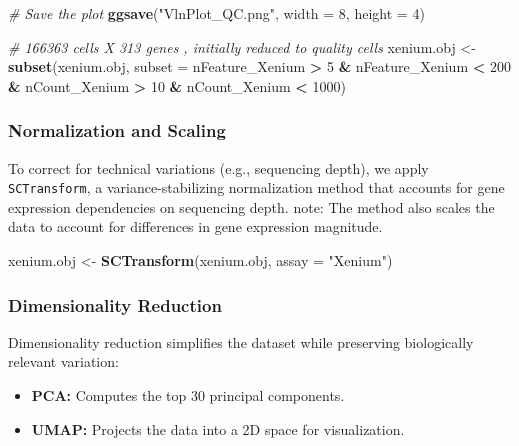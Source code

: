 \documentclass[
]{article}
\newenvironment{Shaded}{\begin{snugshade}}{\end{snugshade}}
\newcommand{\AttributeTok}[1]{\textcolor[rgb]{0.13,0.29,0.53}{#1}}
\newcommand{\CommentTok}[1]{\textcolor[rgb]{0.56,0.35,0.01}{\textit{#1}}}
\newcommand{\DecValTok}[1]{\textcolor[rgb]{0.00,0.00,0.81}{#1}}
\newcommand{\FunctionTok}[1]{\textcolor[rgb]{0.13,0.29,0.53}{\textbf{#1}}}
\newcommand{\NormalTok}[1]{#1}
\newcommand{\OtherTok}[1]{\textcolor[rgb]{0.56,0.35,0.01}{#1}}
\newcommand{\SpecialCharTok}[1]{\textcolor[rgb]{0.81,0.36,0.00}{\textbf{#1}}}
\newcommand{\StringTok}[1]{\textcolor[rgb]{0.31,0.60,0.02}{#1}}
\providecommand{\tightlist}{%
  \setlength{\itemsep}{0pt}\setlength{\parskip}{0pt}}
\begin{document}
\begin{Shaded}
\begin{Highlighting}[]
\CommentTok{\# Save the plot}
\FunctionTok{ggsave}\NormalTok{(}\StringTok{"VlnPlot\_QC.png"}\NormalTok{, }\AttributeTok{width =} \DecValTok{8}\NormalTok{, }\AttributeTok{height =} \DecValTok{4}\NormalTok{)}

\CommentTok{\# 166363 cells X 313 genes , initially reduced to quality cells}
\NormalTok{xenium.obj }\OtherTok{\textless{}{-}} \FunctionTok{subset}\NormalTok{(xenium.obj, }
                     \AttributeTok{subset =}\NormalTok{ nFeature\_Xenium }\SpecialCharTok{\textgreater{}} \DecValTok{5} \SpecialCharTok{\&}\NormalTok{ nFeature\_Xenium }\SpecialCharTok{\textless{}} \DecValTok{200} \SpecialCharTok{\&} 
\NormalTok{                       nCount\_Xenium }\SpecialCharTok{\textgreater{}} \DecValTok{10} \SpecialCharTok{\&}\NormalTok{ nCount\_Xenium }\SpecialCharTok{\textless{}} \DecValTok{1000}\NormalTok{)}
\end{Highlighting}
\end{Shaded}

\subsubsection{Normalization and
Scaling}\label{normalization-and-scaling}

To correct for technical variations (e.g., sequencing depth), we apply
\texttt{SCTransform}, a variance-stabilizing normalization method that
accounts for gene expression dependencies on sequencing depth. note: The
method also scales the data to account for differences in gene
expression magnitude.

\begin{Shaded}
\begin{Highlighting}[]
\NormalTok{xenium.obj }\OtherTok{\textless{}{-}} \FunctionTok{SCTransform}\NormalTok{(xenium.obj, }\AttributeTok{assay =} \StringTok{"Xenium"}\NormalTok{)}
\end{Highlighting}
\end{Shaded}

\subsubsection{Dimensionality Reduction}\label{dimensionality-reduction}

Dimensionality reduction simplifies the dataset while preserving
biologically relevant variation:

\begin{itemize}
\tightlist
\item
  \textbf{PCA:} Computes the top 30 principal components.
\item
  \textbf{UMAP:} Projects the data into a 2D space for visualization.
\end{itemize}
\end{document}
